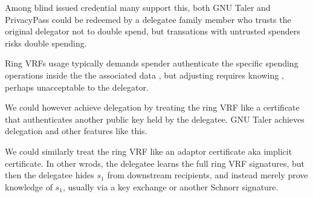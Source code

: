 Among blind issued credential many support this, both
GNU Taler \cite{taler} and PrivacyPass \cite{PrivacyPass} could
be redeemed by a delegatee family member who trusts the original
delegator not to double spend, but transations with untrusted spenders
risks double spending.  

Ring VRFs usage typically demands spender authenticate the specific
spending operations inside the the associated data \aux, but adjusting
\aux requires knowing \sk, perhaps unacceptable to the delegator.

We could however achieve delegation by treating the ring VRF like a
certificate that authenticates another public key held by the delegatee.
GNU Taler achieves delegation and other features like this.

We could similarly treat the ring VRF like an adaptor certificate aka
implicit certificate.  In other wrods, the delegatee learns the full
ring VRF signatures, but then the delegatee hides $s_1$ from downstream
recipients, and instead merely prove knowledge of $s_1$, usually via
a key exchange or another Schnorr signature.

